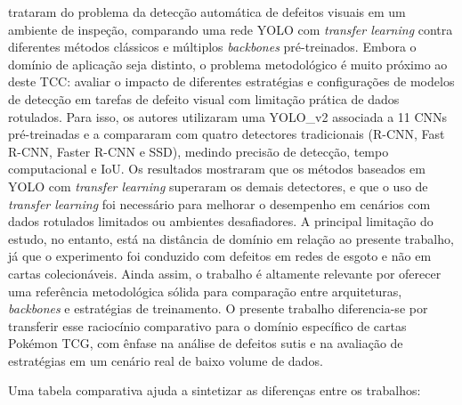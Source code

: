 \documentclass[
    12pt,                %
    openright,           %
    oneside,             %
    a4paper,             %
    english,             %
    brazil               %
]{abntex2}
\begin{document}
 trataram do problema da detecção automática de defeitos visuais em um ambiente de inspeção, comparando uma rede YOLO com \textit{transfer learning} contra diferentes métodos clássicos e múltiplos \textit{backbones} pré-treinados. Embora o domínio de aplicação seja distinto, o problema metodológico é muito próximo ao deste TCC: avaliar o impacto de diferentes estratégias e configurações de modelos de detecção em tarefas de defeito visual com limitação prática de dados rotulados. Para isso, os autores utilizaram uma YOLO\_v2 associada a 11 CNNs pré-treinadas e a compararam com quatro detectores tradicionais (R-CNN, Fast R-CNN, Faster R-CNN e SSD), medindo precisão de detecção, tempo computacional e IoU. Os resultados mostraram que os métodos baseados em YOLO com \textit{transfer learning} superaram os demais detectores, e que o uso de \textit{transfer learning} foi necessário para melhorar o desempenho em cenários com dados rotulados limitados ou ambientes desafiadores. A principal limitação do estudo, no entanto, está na distância de domínio em relação ao presente trabalho, já que o experimento foi conduzido com defeitos em redes de esgoto e não em cartas colecionáveis. Ainda assim, o trabalho é altamente relevante por oferecer uma referência metodológica sólida para comparação entre arquiteturas, \textit{backbones} e estratégias de treinamento. O presente trabalho diferencia-se por transferir esse raciocínio comparativo para o domínio específico de cartas Pokémon TCG, com ênfase na análise de defeitos sutis e na avaliação de estratégias em um cenário real de baixo volume de dados.  

\vspace{0.5cm}

Uma tabela comparativa ajuda a sintetizar as diferenças entre os trabalhos:
\end{document}
